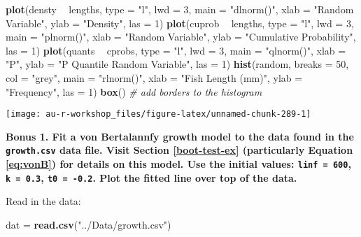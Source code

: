 \documentclass[]{book}
\newenvironment{Shaded}{\begin{snugshade}}{\end{snugshade}}
\newcommand{\KeywordTok}[1]{\textcolor[rgb]{0.13,0.29,0.53}{\textbf{#1}}}
\newcommand{\DataTypeTok}[1]{\textcolor[rgb]{0.13,0.29,0.53}{#1}}
\newcommand{\DecValTok}[1]{\textcolor[rgb]{0.00,0.00,0.81}{#1}}
\newcommand{\StringTok}[1]{\textcolor[rgb]{0.31,0.60,0.02}{#1}}
\newcommand{\CommentTok}[1]{\textcolor[rgb]{0.56,0.35,0.01}{\textit{#1}}}
\newcommand{\OperatorTok}[1]{\textcolor[rgb]{0.81,0.36,0.00}{\textbf{#1}}}
\newcommand{\NormalTok}[1]{#1}
\theoremstyle{definition}
\theoremstyle{definition}
\theoremstyle{definition}
\theoremstyle{remark}
\begin{document}
\begin{Shaded}
\begin{Highlighting}[]
\KeywordTok{plot}\NormalTok{(densty }\OperatorTok{~}\StringTok{ }\NormalTok{lengths, }\DataTypeTok{type =} \StringTok{"l"}\NormalTok{, }\DataTypeTok{lwd =} \DecValTok{3}\NormalTok{, }\DataTypeTok{main =} \StringTok{"dlnorm()"}\NormalTok{,}
     \DataTypeTok{xlab =} \StringTok{"Random Variable"}\NormalTok{, }\DataTypeTok{ylab =} \StringTok{"Density"}\NormalTok{, }\DataTypeTok{las =} \DecValTok{1}\NormalTok{)}
\KeywordTok{plot}\NormalTok{(cuprob }\OperatorTok{~}\StringTok{ }\NormalTok{lengths, }\DataTypeTok{type =} \StringTok{"l"}\NormalTok{, }\DataTypeTok{lwd =} \DecValTok{3}\NormalTok{, }\DataTypeTok{main =} \StringTok{"plnorm()"}\NormalTok{,}
     \DataTypeTok{xlab =} \StringTok{"Random Variable"}\NormalTok{, }\DataTypeTok{ylab =} \StringTok{"Cumulative Probability"}\NormalTok{, }\DataTypeTok{las =} \DecValTok{1}\NormalTok{)}
\KeywordTok{plot}\NormalTok{(quants }\OperatorTok{~}\StringTok{ }\NormalTok{cprobs, }\DataTypeTok{type =} \StringTok{"l"}\NormalTok{, }\DataTypeTok{lwd =} \DecValTok{3}\NormalTok{, }\DataTypeTok{main =} \StringTok{"qlnorm()"}\NormalTok{,}
     \DataTypeTok{xlab =} \StringTok{"P"}\NormalTok{, }\DataTypeTok{ylab =} \StringTok{"P Quantile Random Variable"}\NormalTok{, }\DataTypeTok{las =} \DecValTok{1}\NormalTok{)}
\KeywordTok{hist}\NormalTok{(random, }\DataTypeTok{breaks =} \DecValTok{50}\NormalTok{, }\DataTypeTok{col =} \StringTok{"grey"}\NormalTok{, }\DataTypeTok{main =} \StringTok{"rlnorm()"}\NormalTok{,}
     \DataTypeTok{xlab =} \StringTok{"Fish Length (mm)"}\NormalTok{, }\DataTypeTok{ylab =} \StringTok{"Frequency"}\NormalTok{, }\DataTypeTok{las =} \DecValTok{1}\NormalTok{)}
\KeywordTok{box}\NormalTok{() }\CommentTok{# add borders to the histogram}
\end{Highlighting}
\end{Shaded}

\begin{center}\texttt{[image: au-r-workshop\_files/figure-latex/unnamed-chunk-289-1]} \end{center}

\textbf{Bonus 1. Fit a von Bertalannfy growth model to the data found in
the \texttt{growth.csv} data file. Visit Section \ref{boot-test-ex}
(particularly Equation \eqref{eq:vonB}) for details on this model. Use the
initial values: \texttt{linf\ =\ 600}, \texttt{k\ =\ 0.3},
\texttt{t0\ =\ -0.2}. Plot the fitted line over top of the data.}

Read in the data:

\begin{Shaded}
\begin{Highlighting}[]
\NormalTok{dat =}\StringTok{ }\KeywordTok{read.csv}\NormalTok{(}\StringTok{"../Data/growth.csv"}\NormalTok{)}
\end{Highlighting}
\end{Shaded}
\end{document}
